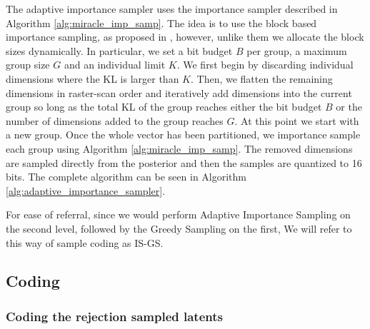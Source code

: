 \documentclass{article}
\begin{document}
The adaptive importance sampler uses the importance sampler described in
Algorithm \ref{alg:miracle_imp_samp}. The idea is to use the block based
importance sampling, as proposed in \cite{havasi2018minimal}, however, unlike
them we allocate the block sizes dynamically. In particular, we set a bit
budget $B$ per group, a maximum group size $G$ and an individual limit $K$.
We first begin by discarding individual dimensions where the KL is larger
than $K$. Then, we flatten the remaining dimensions in raster-scan order and 
iteratively add dimensions into the current group so long as the total KL of the
group reaches either the bit budget $B$ or the number of dimensions added to the
group reaches $G$. At this point we start with a new group. Once the whole
vector has been partitioned, we importance sample each group using Algorithm 
\ref{alg:miracle_imp_samp}. The removed dimensions are sampled directly from
the posterior and then the samples are quantized to 16 bits. The complete
algorithm can be seen in Algorithm \ref{alg:adaptive_importance_sampler}.
\par
For ease of referral, since we would perform Adaptive Importance Sampling on the
second level, followed by the Greedy Sampling on the first, We will refer to
this way of sample coding as IS-GS.
\subsection{Coding}
\label{sec:entropy_coding}
\par

\subsubsection{Coding the rejection sampled latents}
\label{sec:rej_samp_artihmetic_coding}
\end{document}
